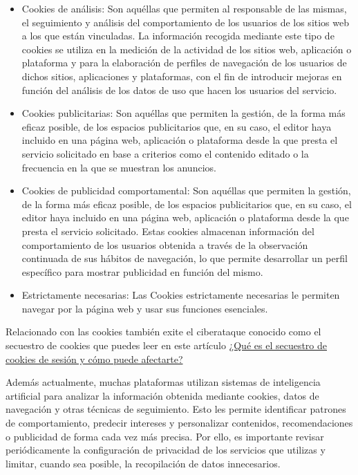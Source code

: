 \documentclass[
  spanish,
  a4paper,
  openany]{book}
\begin{document}
\begin{itemize}
\item
  Cookies de análisis: Son aquéllas que permiten al responsable de las mismas, el seguimiento y análisis del comportamiento de los usuarios de los sitios web a los que están vinculadas. La información recogida mediante este tipo de cookies se utiliza en la medición de la actividad de los sitios web, aplicación o plataforma y para la elaboración de perfiles de navegación de los usuarios de dichos sitios, aplicaciones y plataformas, con el fin de introducir mejoras en función del análisis de los datos de uso que hacen los usuarios del servicio.
\item
  Cookies publicitarias: Son aquéllas que permiten la gestión, de la forma más eficaz posible, de los espacios publicitarios que, en su caso, el editor haya incluido en una página web, aplicación o plataforma desde la que presta el servicio solicitado en base a criterios como el contenido editado o la frecuencia en la que se muestran los anuncios.
\item
  Cookies de publicidad comportamental: Son aquéllas que permiten la gestión, de la forma más eficaz posible, de los espacios publicitarios que, en su caso, el editor haya incluido en una página web, aplicación o plataforma desde la que presta el servicio solicitado. Estas cookies almacenan información del comportamiento de los usuarios obtenida a través de la observación continuada de sus hábitos de navegación, lo que permite desarrollar un perfil específico para mostrar publicidad en función del mismo.
\item
  Estrictamente necesarias: Las Cookies estrictamente necesarias le permiten navegar por la página web y usar sus funciones esenciales.
\end{itemize}

Relacionado con las cookies también exite el ciberataque conocido como el secuestro de cookies que puedes leer en este artículo \href{https://www.incibe.es/ciudadania/blog/que-es-el-secuestro-de-cookies-de-sesion-y-como-puede-afectarte}{¿Qué es el secuestro de cookies de sesión y cómo puede afectarte?}

Además actualmente, muchas plataformas utilizan sistemas de inteligencia artificial para analizar la información obtenida mediante cookies, datos de navegación y otras técnicas de seguimiento. Esto les permite identificar patrones de comportamiento, predecir intereses y personalizar contenidos, recomendaciones o publicidad de forma cada vez más precisa. Por ello, es importante revisar periódicamente la configuración de privacidad de los servicios que utilizas y limitar, cuando sea posible, la recopilación de datos innecesarios.
\end{document}
